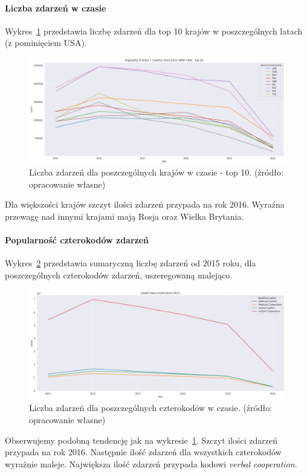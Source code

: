 \documentclass[11pt]{report}
\begin{document}
    \paragraph{Liczba zdarzeń w czasie}
    Wykres~\ref{fig:GLOBALactor1inTime} przedstawia liczbę zdarzeń dla top 10 krajów w poszczególnych latach (z pominięciem USA).
    \begin{figure}[!htp]
        \centering
        \includegraphics[width=\linewidth]{fig/GLOBAL/Actor1inTIMEafterUSA.png}
        \caption{Liczba zdarzeń dla poszczególnych krajów w czasie - top 10. (źródło: opracowanie własne)}
        \label{fig:GLOBALactor1inTime}
    \end{figure}
    Dla większości krajów szczyt ilości zdarzeń przypada na rok 2016.
    Wyraźna przewagę nad innymi krajami mają Rosja oraz Wielka Brytania.

    \paragraph{Popularność czterokodów zdarzeń}
    Wykres~\ref{fig:GLOBALQC} przedstawia sumaryczną liczbę zdarzeń od 2015 roku, dla poszczególnych czterokodów zdarzeń, uszeregowaną malejąco.
    \begin{figure}[!htp]
        \centering
        \includegraphics[width=\linewidth]{fig/GLOBAL/QC.png}
        \caption{Liczba zdarzeń dla poszczególnych czterokodów w czasie. (źródło: opracowanie własne)}
        \label{fig:GLOBALQC}
    \end{figure}
    Obserwujemy podobną tendencję jak na wykresie~\ref{fig:GLOBALactor1inTime}.
    Szczyt ilości zdarzeń przypada na rok 2016.
    Następnie ilość zdarzeń dla wszystkich czterokodów wyraźnie maleje.
    Największa ilość zdarzeń przypada kodowi \textit{verbal cooperation}.
\end{document}
